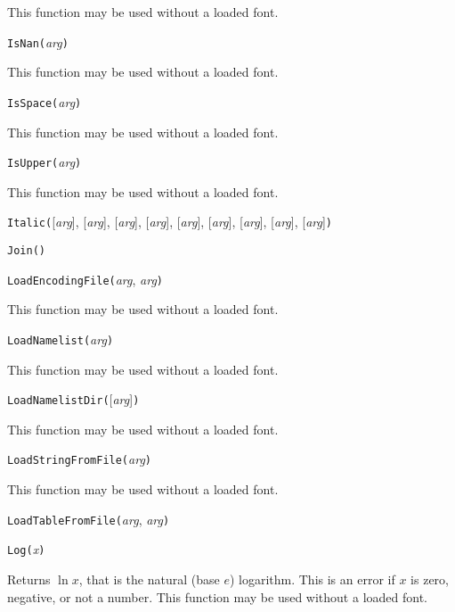 This function may be used without a loaded font.


\noindent\texttt{IsNan(}\textit{arg}\texttt{)}

This function may be used without a loaded font.


\noindent\texttt{IsSpace(}\textit{arg}\texttt{)}

This function may be used without a loaded font.


\noindent\texttt{IsUpper(}\textit{arg}\texttt{)}

This function may be used without a loaded font.


\noindent\texttt{Italic(}[\textit{arg}], [\textit{arg}], [\textit{arg}], [\textit{arg}], [\textit{arg}], [\textit{arg}], [\textit{arg}], [\textit{arg}], [\textit{arg}]\texttt{)}


\noindent\texttt{Join(}\texttt{)}


\noindent\texttt{LoadEncodingFile(}\textit{arg}, \textit{arg}\texttt{)}

This function may be used without a loaded font.


\noindent\texttt{LoadNamelist(}\textit{arg}\texttt{)}

This function may be used without a loaded font.


\noindent\texttt{LoadNamelistDir(}[\textit{arg}]\texttt{)}

This function may be used without a loaded font.


\noindent\texttt{LoadStringFromFile(}\textit{arg}\texttt{)}

This function may be used without a loaded font.


\noindent\texttt{LoadTableFromFile(}\textit{arg}, \textit{arg}\texttt{)}


\noindent\texttt{Log(}\textit{x}\texttt{)}

Returns $\ln x$, that is the natural (base $e$) logarithm.  This is an error
if $x$ is zero, negative, or not a number.
This function may be used without a loaded font.

